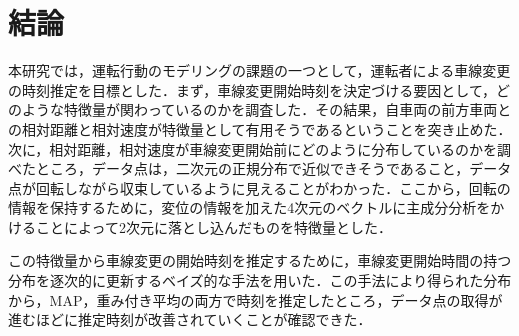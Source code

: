 \chapter{結論}
本研究では，運転行動のモデリングの課題の一つとして，運転者による車線変更の時刻推定を目標とした．まず，車線変更開始時刻を決定づける要因として，どのような特徴量が関わっているのかを調査した．その結果，自車両の前方車両との相対距離と相対速度が特徴量として有用そうであるということを突き止めた．次に，相対距離，相対速度が車線変更開始前にどのように分布しているのかを調べたところ，データ点は，二次元の正規分布で近似できそうであること，データ点が回転しながら収束しているように見えることがわかった．ここから，回転の情報を保持するために，変位の情報を加えた4次元のベクトルに主成分分析をかけることによって2次元に落とし込んだものを特徴量とした．
\par
この特徴量から車線変更の開始時刻を推定するために，車線変更開始時間の持つ分布を逐次的に更新するベイズ的な手法を用いた．この手法により得られた分布から，MAP，重み付き平均の両方で時刻を推定したところ，データ点の取得が進むほどに推定時刻が改善されていくことが確認できた．
